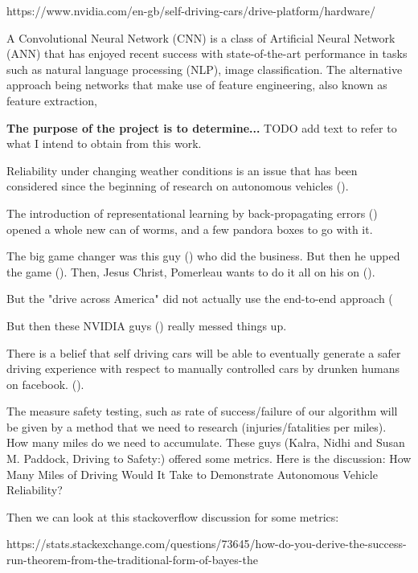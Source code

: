 https://www.nvidia.com/en-gb/self-driving-cars/drive-platform/hardware/




A Convolutional Neural Network (CNN) is a class of Artificial Neural Network (ANN) that has enjoyed recent success with state-of-the-art performance in tasks such as natural language processing (NLP), image classification. The alternative approach being networks that make use of feature engineering, also known as feature extraction, 

\textbf{The purpose of the project is to determine...}  
TODO add text to refer to what I intend to obtain from this work.

Reliability under changing weather conditions is an issue that has been considered since the beginning of research on autonomous vehicles (\cite{3899}).  

The introduction of representational learning by back-propagating errors (\cite{Rumelhart:1986we}) opened a whole new can of worms, and a few pandora boxes to go with it.

The big game changer was this guy (\cite{Pomerleau93knowledge-basedtraining}) who did the business. But then he upped the game (\cite{6796843}). Then, Jesus Christ, Pomerleau wants to do it all on his on (\cite{Jochem-1996-16257}).

But the "drive across America" did not actually use the end-to-end approach (\cite{528333}

But then these NVIDIA guys (\cite{journals/corr/BojarskiTDFFGJM16}) really messed things up.

There is a belief that self driving cars will be able to eventually generate a safer driving experience with respect to manually controlled cars by drunken humans on facebook. (\cite{Dingus201513271}).  

The measure safety testing, such as rate of success/failure of our algorithm will be given by a method that we need to research (injuries/fatalities per miles). How many miles do we need to accumulate. These guys (Kalra, Nidhi and Susan M. Paddock, Driving to Safety:) offered some metrics.
Here is the discussion:   
How Many Miles of Driving Would It Take to Demonstrate Autonomous Vehicle Reliability?

Then we can look at this stackoverflow discussion for some metrics:

https://stats.stackexchange.com/questions/73645/how-do-you-derive-the-success-run-theorem-from-the-traditional-form-of-bayes-the

